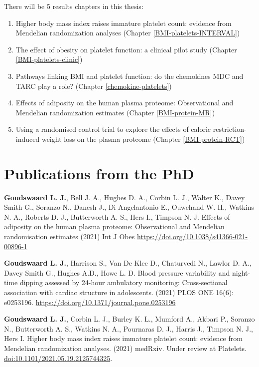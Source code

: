 \documentclass[11pt,twoside]{bristolthesis}
\providecommand{\tightlist}{%
  \setlength{\itemsep}{0pt}\setlength{\parskip}{0pt}}
\begin{document}
There will be 5 results chapters in this thesis:
\begin{enumerate}
\def\labelenumi{\arabic{enumi})}
\tightlist
\item
  Higher body mass index raises immature platelet count: evidence from Mendelian randomization analyses (Chapter \ref{BMI-platelets-INTERVAL})
\item
  The effect of obesity on platelet function: a clinical pilot study (Chapter \ref{BMI-platelets-clinic})
\item
  Pathways linking BMI and platelet function: do the chemokines MDC and TARC play a role? (Chapter \ref{chemokine-platelets})
\item
  Effects of adiposity on the human plasma proteome: Observational and Mendelian randomization estimates (Chapter \ref{BMI-protein-MR})
\item
  Using a randomised control trial to explore the effects of caloric restriction-induced weight loss on the plasma proteome (Chapter \ref{BMI-protein-RCT})
\end{enumerate}
\hypertarget{publications-from-the-phd}{%
\section{Publications from the PhD}\label{publications-from-the-phd}}

\textbf{Goudswaard L. J.}, Bell J. A., Hughes D. A., Corbin L. J., Walter K., Davey Smith G., Soranzo N., Danesh J., Di Angelantonio E., Ouwehand W. H., Watkins N. A., Roberts D. J., Butterworth A. S., Hers I., Timpson N. J. Effects of adiposity on the human plasma proteome: Observational and Mendelian randomisation estimates (2021) Int J Obes \url{https://doi.org/10.1038/s41366-021-00896-1}

\textbf{Goudswaard L. J.}, Harrison S., Van De Klee D., Chaturvedi N., Lawlor D. A., Davey Smith G., Hughes A.D., Howe L. D. Blood pressure variability and night-time dipping assessed by 24-hour ambulatory monitoring: Cross-sectional association with cardiac structure in adolescents. (2021) PLOS ONE 16(6): e0253196. \url{https://doi.org/10.1371/journal.pone.0253196}

\textbf{Goudswaard L. J.}, Corbin L. J., Burley K. L., Mumford A., Akbari P., Soranzo N., Butterworth A. S., Watkins N. A., Pournaras D. J., Harris J., Timpson N. J., Hers I. Higher body mass index raises immature platelet count: evidence from Mendelian randomization analyses. (2021) medRxiv. Under review at Platelets. \url{doi:10.1101/2021.05.19.2125744325}.
\end{document}
